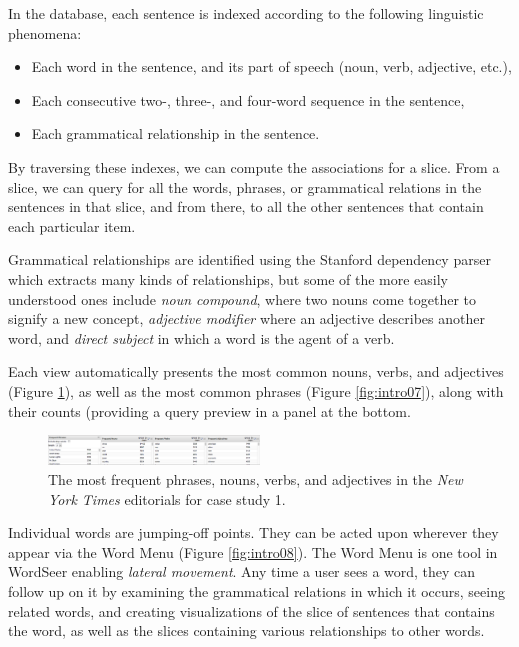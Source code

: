 \documentclass{sig-alternate}
\begin{document}
 In the database, each sentence is indexed according to the following linguistic phenomena:
\begin{itemize}
  \item Each word in the sentence, and its part of speech (noun, verb, adjective, etc.),
  \item Each consecutive two-, three-, and four-word sequence in the sentence,
  \item Each grammatical relationship in the sentence. 
  \end{itemize}  
 By traversing these indexes, we can compute the associations for a slice. From a slice, we can query for all the words, phrases, or grammatical relations in the sentences in that slice, and from there, to all the other sentences that contain each particular item.  

 Grammatical relationships are identified using the Stanford dependency parser\cite{klein_accurate_2003} which extracts many kinds of relationships, but some of the more easily understood ones include \emph{noun compound}, where two nouns come together to signify a new concept, \emph{adjective modifier} where an adjective describes another word, and \emph{direct subject} in which a word is the agent of a verb. 

Each view automatically presents the most common nouns, verbs, and adjectives (Figure \ref{fig:intro06}), as well as the most common phrases (Figure \ref{fig:intro07}), along with their counts (providing a query preview \cite{donn_query_1996} in a panel at the bottom.    
\begin{figure}[ht!]
\begin{center}
	\includegraphics[width=0.5\textwidth]{fig/intro/06.png}
\end{center}
    \caption{%
       The most frequent phrases, nouns, verbs, and adjectives in the \emph{New York Times} editorials for case study 1.  \label{fig:intro06}
     }%
\end{figure}

Individual words are jumping-off points. They can be acted upon wherever they appear via the Word Menu (Figure \ref{fig:intro08}). The Word Menu is one tool in  WordSeer enabling \emph{lateral movement}.  Any time a user sees a word, they can follow up on it by examining the grammatical relations in which it occurs, seeing related words,  and creating visualizations of the slice of sentences that contains the word, as well as the slices containing various relationships to other words.
\end{document}
